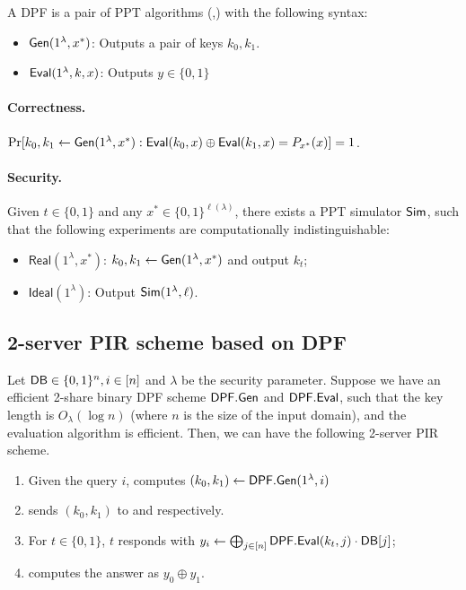 \begin{definition}
    A DPF is a pair of PPT algorithms (\Gen,\Eval) with the following syntax:
    \hfill
    \begin{itemize}
        \item ${\sf Gen}(1^\lambda,x^*)$: Outputs a pair of keys $k_0,k_1$.
        \item ${\sf Eval}(1^\lambda, k,x)$: Outputs $y \in \{0,1\}$
    \end{itemize}
    \paragraph{Correctness.} $\Pr[k_0,k_1 \leftarrow {\sf Gen}(1^\lambda, x^*):{\sf Eval}(k_0,x) \oplus {\sf Eval}(k_1,x) = P_{x^*}(x)] = 1$.
    \paragraph{Security.} Given $t\in\{0,1\}$ and any $x^*\in \{0,1\}^{\ell(\lambda)}$, there exists a PPT simulator ${\sf Sim}$, such that the following experiments are computationally indistinguishable:
    \begin{itemize}
        \item $\mathsf{Real}(1^\lambda, x^*)$: $k_0,k_1\leftarrow  {\sf Gen}(1^\lambda, x^*)$ and output $k_t$;
        \item $\mathsf{Ideal}(1^\lambda)$: Output ${\sf Sim}(1^\lambda, \ell)$.
    \end{itemize}
\end{definition}


\subsection{2-server PIR scheme based on DPF}

Let ${\sf DB} \in \{0,1\}^{n}, i \in [n]$ and $\lambda$ be the security parameter.
Suppose we have an efficient 2-share binary DPF scheme ${\sf DPF.Gen}$ and ${\sf DPF.Eval}$, such that the key length is $O_\lambda(\log n)$ (where $n$ is the size of the input domain), and the evaluation algorithm is efficient. 
Then, we can have the following 2-server PIR scheme. %

\begin{enumerate}
    \item Given the query $i$, \Client computes $(k_0,k_1) \leftarrow {\sf DPF}.{\sf Gen}(1^\lambda, i)$
    \item \Client sends $(k_0,k_1)$ to  and  respectively.
    \item For $t\in\{0,1\}$, \Server $t$ responds with $y_i \leftarrow \bigoplus_{j\in [n]} {\sf DPF}.{\sf Eval}(k_t,j)\cdot {\sf DB}[j]$;
    \item \Client computes the answer as $y_0 \oplus y_1$.
\end{enumerate}


